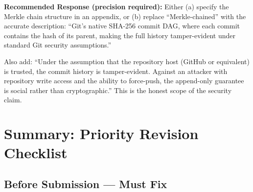 \documentclass[12pt,a4paper]{article}
\theoremstyle{definition}
\begin{document}
\begin{mdframed}[style=defenseframe]
\textbf{Recommended Response (precision required):}
Either (a) specify the Merkle chain structure in an appendix, or (b) replace
``Merkle-chained'' with the accurate description: ``Git's native SHA-256 commit
DAG, where each commit contains the hash of its parent, making the full history
tamper-evident under standard Git security assumptions.''

Also add: ``Under the assumption that the repository host (GitHub or equivalent)
is trusted, the commit history is tamper-evident. Against an attacker with
repository write access and the ability to force-push, the append-only guarantee
is social rather than cryptographic.'' This is the honest scope of the security
claim.
\end{mdframed}

\section{Summary: Priority Revision Checklist}

\subsection*{Before Submission — Must Fix}
\end{document}
